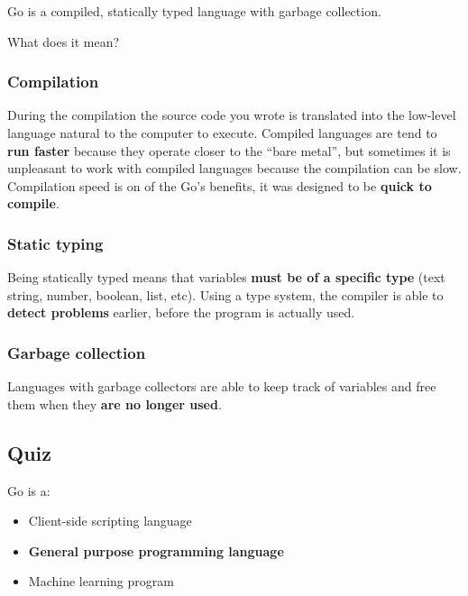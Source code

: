 \documentclass[]{book}
\providecommand{\tightlist}{%
  \setlength{\itemsep}{0pt}\setlength{\parskip}{0pt}}
\begin{document}
Go is a compiled, statically typed language with garbage collection.

What does it mean?

\hypertarget{compilation}{%
\subsubsection*{Compilation}\label{compilation}}

During the compilation the source code you wrote is translated into the
low-level language natural to the computer to execute. Compiled languages are
tend to \textbf{run faster} because they operate closer to the ``bare metal'', but
sometimes it is unpleasant to work with compiled languages because the
compilation can be slow. Compilation speed is on of the Go's benefits, it was
designed to be \textbf{quick to compile}.

\hypertarget{static-typing}{%
\subsubsection*{Static typing}\label{static-typing}}

Being statically typed means that variables \textbf{must be of a specific type}
(text string, number, boolean, list, etc). Using a type system, the compiler is
able to \textbf{detect problems} earlier, before the program is actually used.

\hypertarget{garbage-collection}{%
\subsubsection*{Garbage collection}\label{garbage-collection}}

Languages with garbage collectors are able to keep track of variables and free
them when they \textbf{are no longer used}.

\hypertarget{quiz}{%
\subsection{Quiz}\label{quiz}}

Go is a:

\begin{itemize}
\tightlist
\item
  Client-side scripting language
\item
  \textbf{General purpose programming language}
\item
  Machine learning program
\end{itemize}
\end{document}
